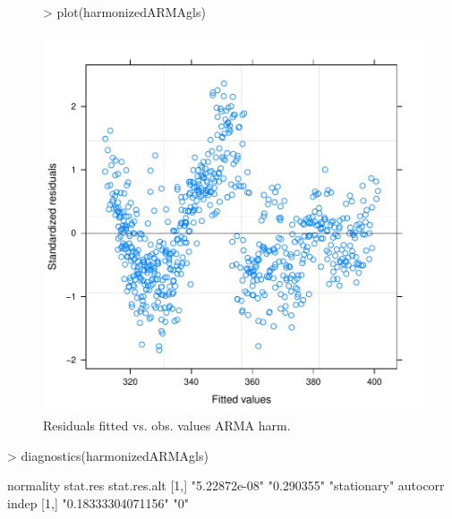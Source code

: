 \documentclass[11pt, a4paper]{article} %
\begin{document}
\begin{figure}[H]
\centering
\begin{Schunk}
\begin{Sinput}
> plot(harmonizedARMAgls)
\end{Sinput}
\end{Schunk}
\includegraphics{alleselena-044}
\caption{Residuals fitted vs. obs. values ARMA harm.}
\label{comparison_finalgls3}
\end{figure}

\begin{Schunk}
\begin{Sinput}
> diagnostics(harmonizedARMAgls)
\end{Sinput}
\begin{Soutput}
     normality     stat.res   stat.res.alt
[1,] "5.22872e-08" "0.290355" "stationary"
     autocorr           indep
[1,] "0.18333304071156" "0"  
\end{Soutput}
\end{Schunk}
\end{document}

